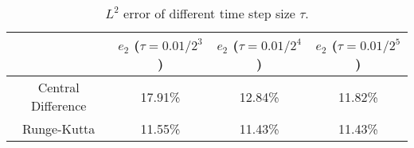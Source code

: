 \documentclass[preprint,12pt]{elsarticle}
\begin{document}
\begin{table}[H]
\centering
\begin{tabular}{c|c|c|c}
~ & $e_2$ ($\tau =0.01/2^3$)  & $e_2$ ($\tau =0.01/2^4$) & $e_2$ ($\tau =0.01/2^5$) \\
\hline
Central Difference& 17.91\%  & 12.84\% & 11.82\% \\
\hline
Runge-Kutta & 11.55\%& 11.43\% & 11.43\%\\
\hline
\end{tabular}
\caption{$L^2$ error of different time step size $\tau$.}
 \label{tablecee0}
\end{table}
\end{document}
